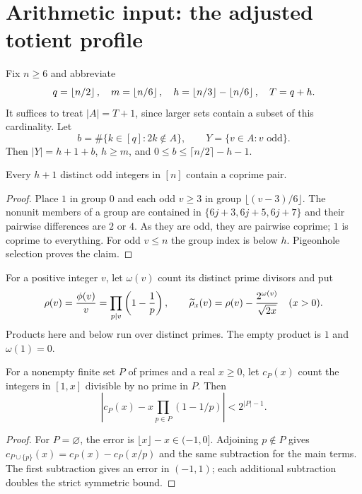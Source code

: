 \section{Arithmetic input: the adjusted totient profile}\label{sec:arithmetic}
Fix $n\ge6$ and abbreviate
\[
 q=\left\lfloor n/2\right\rfloor,\quad m=\left\lfloor n/6\right\rfloor,\quad
 h=\left\lfloor n/3\right\rfloor-\left\lfloor n/6\right\rfloor,\quad T=q+h.
\]
It suffices to treat $|A|=T+1$, since larger sets contain a subset of this cardinality. Let
\[
 b=\#\{k\in[q]:2k\notin A\},\qquad Y=\{v\in A:v\text{ odd}\}.
\]
Then $|Y|=h+1+b$, $h\ge m$, and
$0\le b\le\lceil n/2\rceil-h-1$.

\begin{lemma}\label{lem:endpoints}
Every $h+1$ distinct odd integers in $[n]$ contain a coprime pair.
\end{lemma}
\begin{proof}
Place $1$ in group $0$ and each odd $v\ge3$ in group $\lfloor(v-3)/6\rfloor$. The nonunit members of a group are contained in $\{6j+3,6j+5,6j+7\}$ and their pairwise differences are $2$ or $4$. As they are odd, they are pairwise coprime; $1$ is coprime to everything. For odd $v\le n$ the group index is below $h$. Pigeonhole selection proves the claim.
\end{proof}

For a positive integer $v$, let $\omega(v)$ count its distinct prime divisors and put
\[
 \rho(v)=\frac{\phi(v)}v=\prod_{p\mid v}\left(1-\frac1p\right),
 \qquad \widetilde\rho_x(v)=\rho(v)-\frac{2^{\omega(v)}}{\sqrt{2x}}\quad(x>0).
\]
Products here and below run over distinct primes. The empty product is $1$ and $\omega(1)=0$.

\begin{lemma}\label{lem:legendre}
For a nonempty finite set $P$ of primes and a real $x\ge0$, let $c_P(x)$ count the integers in $[1,x]$ divisible by no prime in $P$. Then
\[
\left|c_P(x)-x\prod_{p\in P}(1-1/p)\right|<2^{|P|-1}.
\]
\end{lemma}
\begin{proof}
For $P=\varnothing$, the error is $\lfloor x\rfloor-x\in(-1,0]$. Adjoining $p\notin P$ gives
$c_{P\cup\{p\}}(x)=c_P(x)-c_P(x/p)$ and the same subtraction for the main terms. The first subtraction gives an error in $(-1,1)$; each additional subtraction doubles the strict symmetric bound.
\end{proof}

